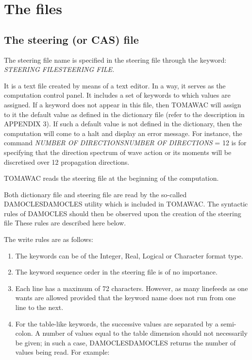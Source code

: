 \section{ The files}


\subsection{ The steering (or CAS) file}

 The steering file name is specified in the steering file through the keyword: \textit{STEERING FILESTEERING FILE.}

 It is a text file created by means of a text editor. In a way, it serves as the computation control panel. It includes a set of keywords to which values are assigned. If a keyword does not appear in this file, then TOMAWAC will assign to it the default value as defined in the dictionary file (refer to the description in APPENDIX 3). If such a default value is not defined in the dictionary, then the computation will come to a halt and display an error message. For instance, the command \textit{NUMBER OF DIRECTIONSNUMBER OF DIRECTIONS} = 12 is for specifying that the direction spectrum of wave action or its moments will be discretised over 12 propagation directions.

 TOMAWAC reads the steering file at the beginning of the computation.

 Both dictionary file and steering file are read by the so-called DAMOCLESDAMOCLES utility which is included in TOMAWAC. The syntactic rules of DAMOCLES should then be observed upon the creation of the steering file These rules are described here below.

 The write rules are as follows:

\begin{enumerate}
\item  The keywords can be of the Integer, Real, Logical or Character format type.

\item  The keyword sequence order in the steering file is of no importance.

\item  Each line has a maximum of 72 characters. However, as many linefeeds as one wants are allowed provided that the keyword name does not run from one line to the next.

\item  For the table-like keywords, the successive values are separated by a semi-colon. A number of values equal to the table dimension should not necessarily be given; in such a case, DAMOCLESDAMOCLES returns the number of values being read. For example:
\end{enumerate}

